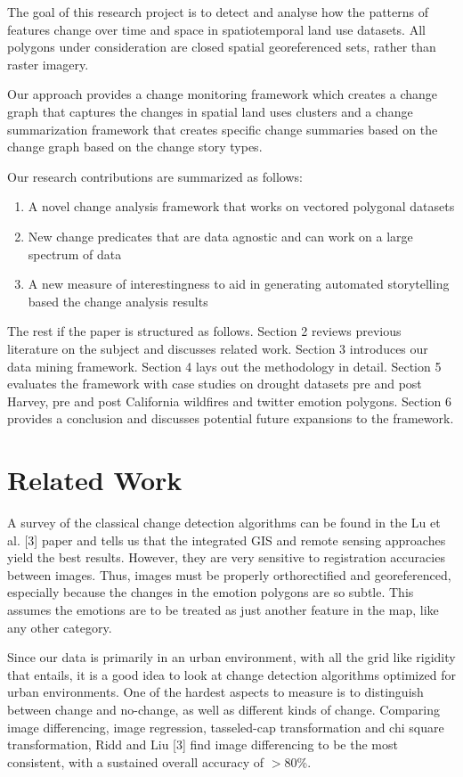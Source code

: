 \documentclass[conference]{IEEEtran}
\begin{document}
The goal of this research project is to detect and analyse how the patterns of features change over time and space in spatiotemporal land use datasets. All polygons under consideration are closed spatial  georeferenced sets, rather than raster imagery.

Our approach provides a change monitoring framework which creates a change graph that captures the changes in spatial land uses clusters and a change summarization framework that creates specific change summaries based on the change graph based on the change story types. 

Our research contributions are summarized as follows:

\begin{enumerate}
 \item A novel change analysis framework that works on vectored polygonal datasets
 \item New change predicates that are data agnostic and can work on a large spectrum of data
 \item A new measure of interestingness to aid in generating automated storytelling based the change analysis results
\end{enumerate}

The rest if the paper is structured as follows. Section 2 reviews previous literature on the subject and discusses related work.  Section 3 introduces our data mining framework. Section 4 lays out the methodology in detail. Section 5 evaluates the framework with case studies on drought datasets pre and post Harvey, pre and post California wildfires and twitter emotion polygons. Section 6 provides a conclusion and discusses potential future expansions to the framework.


\section{Related Work}

A survey of the classical change detection algorithms can be found in the Lu et al. [3] paper and tells us that the integrated GIS and remote sensing approaches yield the best results. However, they are very sensitive to registration accuracies between images. Thus, images must be properly orthorectified and georeferenced, especially because the changes in the emotion polygons are so subtle. This assumes the emotions are to be treated as just another feature in the map, like any other category.

Since our data is primarily in an urban environment, with all the grid like rigidity that entails, it is a good idea to look at change detection algorithms optimized for urban environments. One of the hardest aspects to measure is to distinguish between change and no-change, as well as different kinds of change. Comparing image differencing, image regression, tasseled-cap transformation and chi square transformation, Ridd and Liu [3] find image differencing to be the most consistent, with a sustained overall accuracy of 
$>$80\%.
\end{document}
